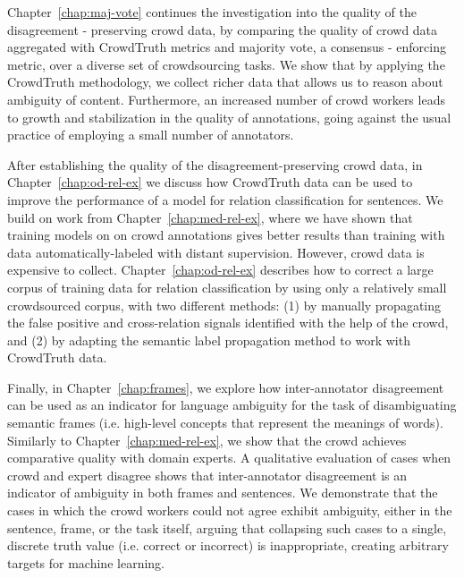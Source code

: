 Chapter~\ref{chap:maj-vote} continues the investigation into the quality of the disagreement - preserving crowd data, by comparing the quality of crowd data aggregated with CrowdTruth metrics and majority vote, a consensus - enforcing metric, over a diverse set of crowdsourcing tasks. We show that by applying the CrowdTruth methodology, we collect richer data that allows us to reason about ambiguity of content. Furthermore, an increased number of crowd workers leads to growth and stabilization in the quality of annotations, going against the usual practice of employing a small number of annotators.

After establishing the quality of the disagreement-preserving crowd data, in Chapter~\ref{chap:od-rel-ex} we discuss how CrowdTruth data can be used to improve the performance of a model for relation classification for sentences. We build on work from Chapter~\ref{chap:med-rel-ex}, where we have shown that training models on on crowd annotations gives better results than training with data automatically-labeled with distant supervision. However, crowd data is expensive to collect. Chapter~\ref{chap:od-rel-ex} describes how to correct a large corpus of training data for relation classification by using only a relatively small crowdsourced corpus, with two different methods: (1) by manually propagating the false positive and cross-relation signals identified with the help of the crowd, and (2) by adapting the semantic label propagation method to work with CrowdTruth data.

Finally, in Chapter~\ref{chap:frames}, we explore how inter-annotator disagreement can be used as an indicator for language ambiguity for the task of disambiguating semantic frames (i.e. high-level concepts that represent the meanings of words). Similarly to Chapter~\ref{chap:med-rel-ex}, we show that the crowd achieves comparative quality with domain experts. A qualitative evaluation of cases when crowd and expert disagree shows that inter-annotator disagreement is an indicator of ambiguity in both frames and sentences. We demonstrate that the cases in which the crowd workers could not agree exhibit ambiguity, either in the sentence, frame, or the task itself, arguing that collapsing such cases to a single, discrete truth value (i.e. correct or incorrect) is inappropriate, creating arbitrary targets for machine learning.
